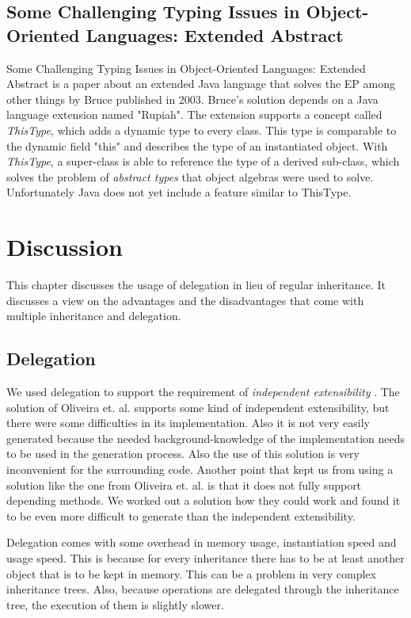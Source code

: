 \documentclass{report}
\begin{document}
\subsection*{Some Challenging Typing Issues in Object-Oriented Languages: Extended Abstract}

{Some Challenging Typing Issues in Object-Oriented Languages: Extended Abstract} is a paper about an extended Java language that solves the EP among other things by Bruce published in 2003\cite{Bruce-Typing-2003}.
Bruce's solution depends on a Java language extension named "Rupiah"\cite{Foster-Rupiah-2001}. The extension supports a concept called \emph{ThisType}, which adds a dynamic type to every class. This type is comparable to the dynamic field "this" and describes the type of an instantiated object. With \emph{ThisType}, a super-class is able to reference the type of a derived sub-class, which solves the problem of \emph{abstract types} that object algebras were used to solve. Unfortunately Java does not yet include a feature similar to ThisType.

\section{Discussion}

This chapter discusses the usage of delegation in lieu of regular inheritance. It discusses a view on the advantages and the disadvantages that come with multiple inheritance and delegation.

\subsection{Delegation}
We used delegation to support the requirement of \emph{independent extensibility} \cite{Odersky-Expression-2005, Oliv-Extensibility-2012}. The solution of Oliveira et. al. supports some kind of independent extensibility, but there were some difficulties in its implementation. Also it is not very easily generated because the needed background-knowledge of the implementation needs to be used in the generation process. Also the use of this solution is very inconvenient for the surrounding code. Another point that kept us from using a solution like the one from Oliveira et. al. is that it does not fully support depending methods. We worked out a solution how they could work and found it to be even more difficult to generate than the independent extensibility.

Delegation comes with some overhead in memory usage, instantiation speed and usage speed. This is because for every inheritance there has to be at least another object that is to be kept in memory. This can be a problem in very complex inheritance trees. Also, because operations are delegated through the inheritance tree, the execution of them is slightly slower.
\end{document}
